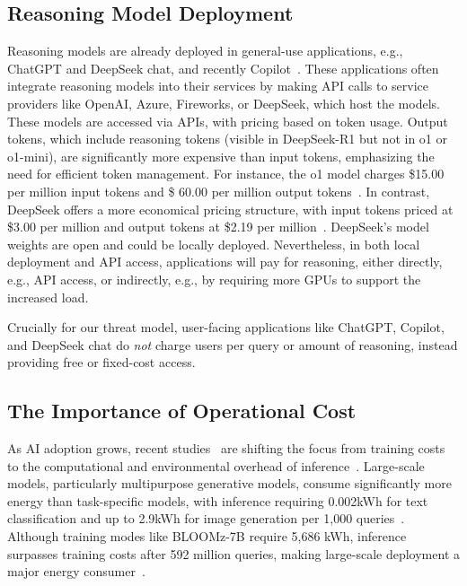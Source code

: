 \subsection{Reasoning Model Deployment}

Reasoning models are already deployed in general-use applications, e.g., ChatGPT and DeepSeek chat, and recently Copilot~\cite{verge_microsoft_o1_copilot_2025}. These applications often integrate reasoning models into their services by making API calls to service providers like OpenAI, Azure, Fireworks, or DeepSeek, which host the models. These models are accessed via APIs, with pricing based on token usage. Output tokens, which include reasoning tokens (visible in DeepSeek-R1 but not in o1 or o1-mini), are significantly more expensive than input tokens, emphasizing the need for efficient token management. For instance, the o1 model charges \$15.00 per million input tokens and \$ 60.00 per million output tokens~\citep{openai_pricing}. In contrast, DeepSeek offers a more economical pricing structure, with input tokens priced at \$3.00 per million and output tokens at \$2.19 per million~\citep{deepseek_pricing}. DeepSeek's model weights are open and could be locally deployed. Nevertheless,   in both local deployment and API access, applications will pay for reasoning, either directly, e.g., API access, or indirectly, e.g., by requiring more GPUs to support the increased load. 

Crucially for our threat model, user-facing applications like ChatGPT, Copilot, and DeepSeek chat do \emph{not} charge users per query or amount of reasoning, instead providing free or fixed-cost access.









\subsection{The Importance of Operational Cost}

As AI adoption grows, recent studies~\citep{samsi2023words, luccioni2024power, varoquaux2024hype} are shifting the focus from training costs to the computational and environmental overhead of inference~\citep{samsi2023words}. Large-scale models, particularly multipurpose generative models, consume significantly more energy than task-specific models, with inference requiring 0.002kWh for text classification and up to 2.9kWh for image generation per 1,000 queries~\citep{luccioni2024power}. Although training modes like BLOOMz-7B require 5,686 kWh, inference surpasses training costs after 592 million queries, making large-scale deployment a major energy consumer~\citep{patterson2022carbon}. 









